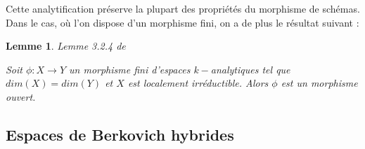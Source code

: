 \documentclass[11pt]{article}
\newtheorem{prop}[thm]{Proposition}
\newtheorem{lem}[thm]{Lemme}
\begin{document}
Cette analytification préserve la plupart des propriétés du morphisme de schémas. Dans le cas, où l'on dispose d'un morphisme fini, on a de plus le résultat suivant : 




\begin{lem}\label{morphisme fini sur meme dimension est ouvert} Lemme 3.2.4 de \cite{BerkovichLivre}

Soit $\phi : X \rightarrow Y$ un morphisme fini d'espaces $k-$analytiques tel que $dim(X) = dim(Y)$ et $X$ est localement irréductible. Alors $\phi$ est un morphisme ouvert.
\end{lem}




\subsection{Espaces de Berkovich hybrides}
\end{document}
